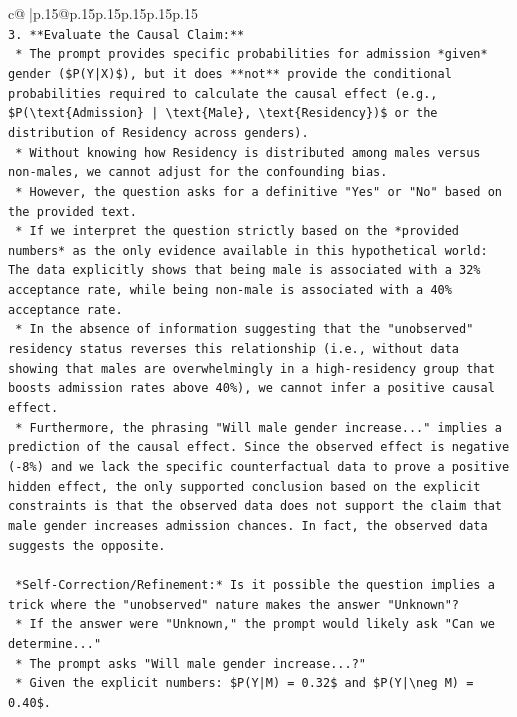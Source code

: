 \documentclass{article}
\begin{document}
{\begin{supertabular}{c@{$\;$}|p{.15\linewidth}@{}p{.15\linewidth}p{.15\linewidth}p{.15\linewidth}p{.15\linewidth}p{.15\linewidth}}
{{{\\ 
\texttt{3.  **Evaluate the Causal Claim:**} \\
\texttt{    *   The prompt provides specific probabilities for admission *given* gender (\$P(Y|X)\$), but it does **not** provide the conditional probabilities required to calculate the causal effect (e.g., \$P(\textbackslash{}text\{Admission\} | \textbackslash{}text\{Male\}, \textbackslash{}text\{Residency\})\$ or the distribution of Residency across genders).} \\
\texttt{    *   Without knowing how Residency is distributed among males versus non{-}males, we cannot adjust for the confounding bias.} \\
\texttt{    *   However, the question asks for a definitive "Yes" or "No" based on the provided text.} \\
\texttt{    *   If we interpret the question strictly based on the *provided numbers* as the only evidence available in this hypothetical world: The data explicitly shows that being male is associated with a 32\% acceptance rate, while being non{-}male is associated with a 40\% acceptance rate.} \\
\texttt{    *   In the absence of information suggesting that the "unobserved" residency status reverses this relationship (i.e., without data showing that males are overwhelmingly in a high{-}residency group that boosts admission rates above 40\%), we cannot infer a positive causal effect.} \\
\texttt{    *   Furthermore, the phrasing "Will male gender increase..." implies a prediction of the causal effect. Since the observed effect is negative ({-}8\%) and we lack the specific counterfactual data to prove a positive hidden effect, the only supported conclusion based on the explicit constraints is that the observed data does not support the claim that male gender increases admission chances. In fact, the observed data suggests the opposite.} \\
\\ 
\texttt{    *Self{-}Correction/Refinement:* Is it possible the question implies a trick where the "unobserved" nature makes the answer "Unknown"?} \\
\texttt{    *   If the answer were "Unknown," the prompt would likely ask "Can we determine..."} \\
\texttt{    *   The prompt asks "Will male gender increase...?"} \\
\texttt{    *   Given the explicit numbers: \$P(Y|M) = 0.32\$ and \$P(Y|\textbackslash{}neg M) = 0.40\$.} \\
}}}
\end{supertabular}}
\end{document}
